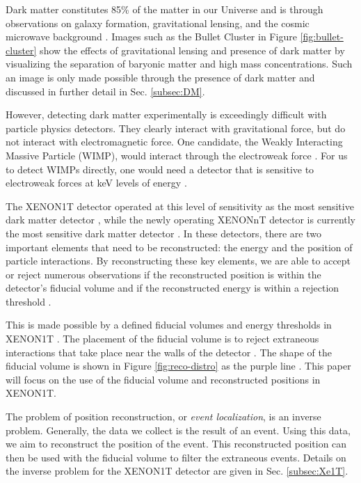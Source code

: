\documentclass[thesis.tex]{subfiles}
\begin{document}
Dark matter constitutes 85\% of the matter in our Universe and is through observations on galaxy formation, gravitational lensing, and the cosmic microwave background \cite{DM_Hist}.
Images such as the Bullet Cluster in Figure \ref{fig:bullet-cluster} show the effects of gravitational lensing and presence of dark matter by visualizing the separation of baryonic matter and high mass concentrations.
Such an image is only made possible through the presence of dark matter and discussed in further detail in Sec. \ref{subsec:DM}.

\par However, detecting dark matter experimentally is exceedingly difficult with particle physics detectors.
They clearly interact with gravitational force, but do not interact with electromagnetic force.
One candidate, the Weakly Interacting Massive Particle (WIMP), would interact through the electroweak force \cite{DM_Hist}.
For us to detect WIMPs directly, one would need a detector that is sensitive to electroweak forces at keV levels of energy \cite{DM_Hist}.

\par The XENON1T detector operated at this level of sensitivity as the most sensitive dark matter detector \cite{Xenon1t}, while the newly operating XENONnT detector is currently the most sensitive dark matter detector \cite{nT_Projection}.
In these detectors, there are two important elements that need to be reconstructed: the energy and the position of particle interactions.
By reconstructing these key elements, we are able to accept or reject numerous observations if the reconstructed position is within the detector's fiducial volume and if the reconstructed energy is within a rejection threshold \cite{1TDM_DataAnalysis}.

\par This is made possible by a defined fiducial volumes and energy thresholds in XENON1T \cite{1TDM_DataAnalysis}.
The placement of the fiducial volume is to reject extraneous interactions that take place near the walls of the detector \cite{1TDM_DataAnalysis}.
The shape of the fiducial volume is shown in Figure \ref{fig:reco-distro} as the purple line \cite{Xe1T-YearExpo}.
This paper will focus on the use of the fiducial volume and reconstructed positions in XENON1T.

\par The problem of position reconstruction, or \textit{event localization}, is an inverse problem.
Generally, the data we collect is the result of an event.
Using this data, we aim to reconstruct the position of the event.
This reconstructed position can then be used with the fiducial volume to filter the extraneous events.
Details on the inverse problem for the XENON1T detector are given in Sec. \ref{subsec:Xe1T}.
\end{document}
